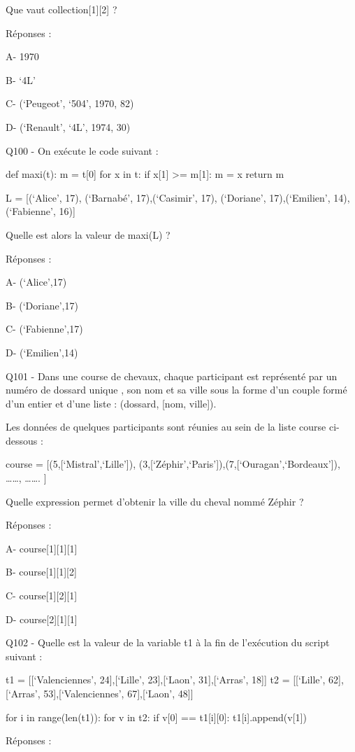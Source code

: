 \documentclass[
]{book}
\begin{document}
Que vaut collection{[}1{]}{[}2{]} ?

Réponses :

A- 1970

B- `4L'

C- (`Peugeot', `504', 1970, 82)

D- (`Renault', `4L', 1974, 30)

Q100 - On exécute le code suivant :

def maxi(t):
m = t{[}0{]}
for x in t:
if x{[}1{]} \textgreater= m{[}1{]}:
m = x
return m

L = {[}(`Alice', 17), (`Barnabé', 17),(`Casimir', 17), (`Doriane', 17),(`Emilien', 14), (`Fabienne', 16){]}

Quelle est alors la valeur de maxi(L) ?

Réponses :

A- (`Alice',17)

B- (`Doriane',17)

C- (`Fabienne',17)

D- (`Emilien',14)

Q101 - Dans une course de chevaux, chaque participant est représenté par un numéro de dossard unique , son nom et sa ville sous la forme d'un couple formé d'un entier et d'une liste : (dossard, {[}nom, ville{]}).

Les données de quelques participants sont réunies au sein de la liste course ci-dessous :

course = {[}(5,{[}`Mistral',`Lille'{]}), (3,{[}`Zéphir',`Paris'{]}),(7,{[}`Ouragan',`Bordeaux'{]}), \ldots\ldots, \ldots\ldots. {]}

Quelle expression permet d'obtenir la ville du cheval nommé Zéphir ?

Réponses :

A- course{[}1{]}{[}1{]}{[}1{]}

B- course{[}1{]}{[}1{]}{[}2{]}

C- course{[}1{]}{[}2{]}{[}1{]}

D- course{[}2{]}{[}1{]}{[}1{]}

Q102 - Quelle est la valeur de la variable t1 à la fin de l'exécution du script suivant :

t1 = {[}{[}`Valenciennes', 24{]},{[}`Lille', 23{]},{[}`Laon', 31{]},{[}`Arras', 18{]}{]}
t2 = {[}{[}`Lille', 62{]},{[}`Arras', 53{]},{[}`Valenciennes', 67{]},{[}`Laon', 48{]}{]}

for i in range(len(t1)):
for v in t2:
if v{[}0{]} == t1{[}i{]}{[}0{]}:
t1{[}i{]}.append(v{[}1{]})

Réponses :
\end{document}
